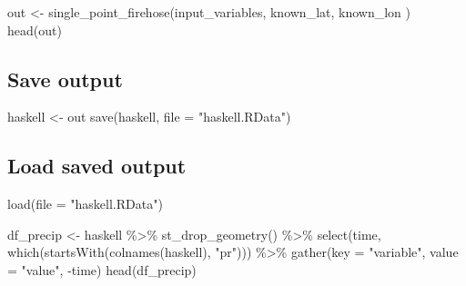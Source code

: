 \documentclass[
  paper=a4,
  ,captions=tableheading
]{scrartcl}
\newenvironment{Shaded}{\begin{snugshade}}{\end{snugshade}}
\newcommand{\AttributeTok}[1]{\textcolor[rgb]{0.77,0.63,0.00}{#1}}
\newcommand{\FunctionTok}[1]{\textcolor[rgb]{0.00,0.00,0.00}{#1}}
\newcommand{\NormalTok}[1]{#1}
\newcommand{\OtherTok}[1]{\textcolor[rgb]{0.56,0.35,0.01}{#1}}
\newcommand{\SpecialCharTok}[1]{\textcolor[rgb]{0.00,0.00,0.00}{#1}}
\newcommand{\StringTok}[1]{\textcolor[rgb]{0.31,0.60,0.02}{#1}}
\begin{document}
\begin{Shaded}
\begin{Highlighting}[]
\NormalTok{out }\OtherTok{\textless{}{-}} \FunctionTok{single\_point\_firehose}\NormalTok{(input\_variables, known\_lat, known\_lon )}
\FunctionTok{head}\NormalTok{(out)}
\end{Highlighting}
\end{Shaded}

\hypertarget{save-output}{%
\subsection{Save output}\label{save-output}}

\begin{Shaded}
\begin{Highlighting}[]
\NormalTok{haskell }\OtherTok{\textless{}{-}}\NormalTok{ out}
\FunctionTok{save}\NormalTok{(haskell, }\AttributeTok{file =} \StringTok{"haskell.RData"}\NormalTok{)}
\end{Highlighting}
\end{Shaded}

\hypertarget{load-saved-output}{%
\subsection{Load saved output}\label{load-saved-output}}

\begin{Shaded}
\begin{Highlighting}[]
\FunctionTok{load}\NormalTok{(}\AttributeTok{file =} \StringTok{"haskell.RData"}\NormalTok{)}
\end{Highlighting}
\end{Shaded}

\begin{Shaded}
\begin{Highlighting}[]
\NormalTok{df\_precip }\OtherTok{\textless{}{-}}\NormalTok{ haskell }\SpecialCharTok{\%\textgreater{}\%}
  \FunctionTok{st\_drop\_geometry}\NormalTok{() }\SpecialCharTok{\%\textgreater{}\%}
  \FunctionTok{select}\NormalTok{(time, }\FunctionTok{which}\NormalTok{(}\FunctionTok{startsWith}\NormalTok{(}\FunctionTok{colnames}\NormalTok{(haskell), }\StringTok{"pr"}\NormalTok{))) }\SpecialCharTok{\%\textgreater{}\%}
  \FunctionTok{gather}\NormalTok{(}\AttributeTok{key =} \StringTok{"variable"}\NormalTok{, }\AttributeTok{value =} \StringTok{"value"}\NormalTok{, }\SpecialCharTok{{-}}\NormalTok{time)}
\FunctionTok{head}\NormalTok{(df\_precip)}
\end{Highlighting}
\end{Shaded}
\end{document}
